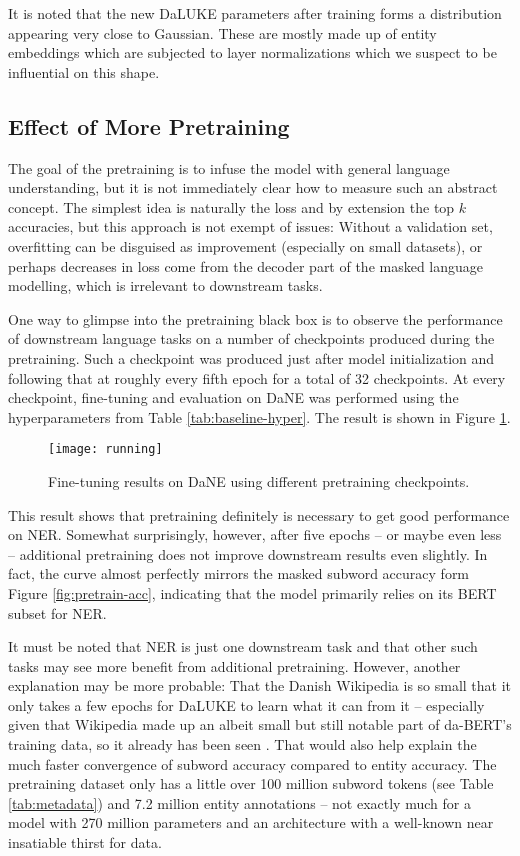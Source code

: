 \documentclass[main.tex]{subfiles}
\begin{document}
It is noted that the new DaLUKE parameters after training forms a distribution appearing very close to Gaussian.
These are mostly made up of entity embeddings which are subjected to layer normalizations which we suspect to be influential on this shape.

\subsection{Effect of More Pretraining}
\label{subsec:effmore}
The goal of the pretraining is to infuse the model with general language understanding, but it is not immediately clear how to measure such an abstract concept.
The simplest idea is naturally the loss and by extension the top $ k $ accuracies, but this approach is not exempt of issues:
Without a validation set, overfitting can be disguised as improvement (especially on small datasets), or perhaps decreases in loss come from the decoder part of the masked language modelling, which is irrelevant to downstream tasks.

One way to glimpse into the pretraining black box is to observe the performance of downstream language tasks on a number of checkpoints produced during the pretraining.
Such a checkpoint was produced just after model initialization and following that at roughly every fifth epoch for a total of 32 checkpoints.
At every checkpoint, fine-tuning and evaluation on DaNE was performed using the hyperparameters from Table \ref{tab:baseline-hyper}.
The result is shown in Figure \ref{fig:running}.
\begin{figure}[H]
    \centering
    \texttt{[image: running]}
    \caption{Fine-tuning results on DaNE using different pretraining checkpoints.}
    \label{fig:running}
\end{figure}\noindent
This result shows that pretraining definitely is necessary to get good performance on NER.
Somewhat surprisingly, however, after five epochs -- or maybe even less -- additional pretraining does not improve downstream results even slightly.
In fact, the curve almost perfectly mirrors the masked subword accuracy form Figure \ref{fig:pretrain-acc}, indicating that the model primarily relies on its BERT subset for NER.

It must be noted that NER is just one downstream task and that other such tasks may see more benefit from additional pretraining.
However, another explanation may be more probable:
That the Danish Wikipedia is so small that it only takes a few epochs for DaLUKE to learn what it can from it -- especially given that Wikipedia made up an albeit small but still notable part of da-BERT's training data, so it already has been seen \cite{botxo2019dabert}.
That would also help explain the much faster convergence of subword accuracy compared to entity accuracy.
The pretraining dataset only has a little over 100 million subword tokens (see Table \ref{tab:metadata}) and 7.2 million entity annotations -- not exactly much for a model with 270 million parameters and an architecture with a well-known near insatiable thirst for data.
\end{document}

